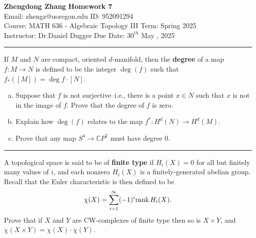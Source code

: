 \documentclass[letterpaper, 12pt]{article}
\begin{document}
\noindent
\large\textbf{Zhengdong Zhang} \hfill \textbf{Homework 7}  \\
Email: zhengz@uoregon.edu \hfill ID: 952091294  \\
\normalsize Course: MATH 636 - Algebraic Topology III \hfill Term: Spring 2025 \\
Instructor: Dr.Daniel Dugger \hfill Due Date: $30^{th}$ May , 2025  \\
\noindent\rule{7in}{2.8pt}
\begin{problem}{1}
If \(M\) and \(N\) are compact, oriented \(d\)-manifold, then the \textbf{degree} of a map \(f:M\rightarrow N\) is defined to be the integer \(\deg(f)\) such that \(f_*([M])=\deg f\cdot [N]\).
\begin{enumerate}[(a)]
\item Suppose that \(f\) is not surjective--i.e., there is a point \(x\in N\) such that \(x\) is not in the image of \(f\). Prove that the degree of \(f\) is zero. 
\item Explain how \(\deg(f)\) relates to the map \(f^*:H^d(N)\rightarrow H^d(M)\). 
\item Prove that any map \(S^4\rightarrow \mathbb{C}P^2\) must have degree 0.
\end{enumerate}
\end{problem}
\begin{solution}

\end{solution}

\noindent\rule{7in}{2.8pt}
\begin{problem}{2}
A topological space is said to be of \textbf{finite type} if \(H_i(X)=0\) for all but finitely many values of \(i\), and each nonzero \(H_i(X)\) is a finitely-generated abelian group. Recall that the Euler characteristic is then defined to be 
\[\chi(X)=\sum_{i=1}^{\infty}(-1)^i\text{rank}\, H_i(X).\]
Prove that if \(X\) and \(Y\) are CW-complexes of finite type then so is \(X\times Y\), and \(\chi(X\times Y)=\chi(X)\cdot \chi(Y)\).
\end{problem}
\begin{solution}

\end{solution}
\end{document}
